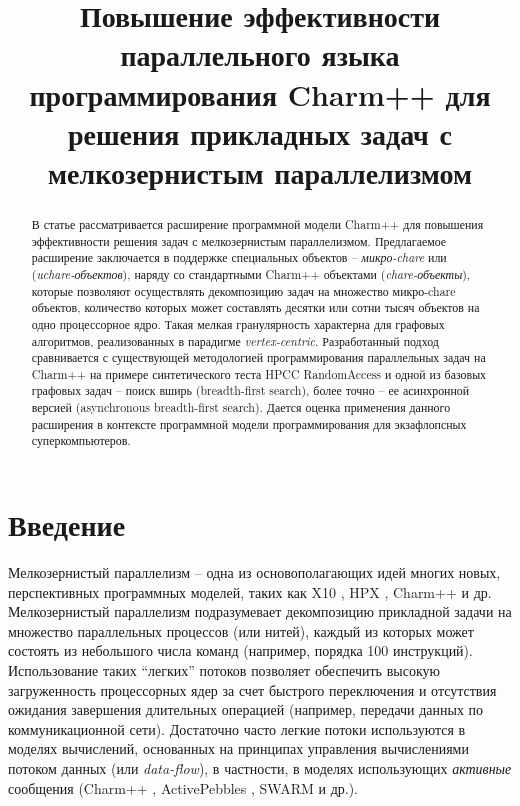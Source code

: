 \documentclass[11pt, oneside, a4paper]{article}
\begin{document}
%
\title{Повышение эффективности параллельного языка программирования Charm++ для решения прикладных задач с мелкозернистым параллелизмом}



\begin{abstract}

В статье рассматривается расширение программной модели Charm++ для повышения эффективности решения задач с 
мелкозернистым параллелизмом. Предлагаемое расширение заключается в поддержке специальных объектов – \textit{микро-chare} 
или (\textit{uchare-объектов}), наряду со стандартными Charm++ объектами (\textit{chare-объекты}), которые позволяют осуществлять 
декомпозицию задач на множество микро-chare объектов, количество которых может составлять десятки или сотни тысяч объектов на 
одно процессорное ядро. Такая мелкая гранулярность характерна для графовых алгоритмов, реализованных в парадигме 
\textit{vertex-centric}. Разработанный подход сравнивается с существующей методологией программирования параллельных задач на Charm++ 
на примере синтетического теста HPCC RandomAccess и одной из базовых графовых задач -- поиск вширь (breadth-first search),
более точно -- ее асинхронной версией (asynchronous breadth-first search). Дается оценка применения данного расширения в контексте 
программной модели программирования для экзафлопсных суперкомпьютеров.

\end{abstract}



\section{Введение}

Мелкозернистый параллелизм -- одна из основополагающих идей многих новых, перспективных программных моделей, таких 
как X10 \cite{Charles2005}, HPX \cite{Kaiser2014}, Charm++ \cite{Kale1993} и др.
Мелкозернистый параллелизм подразумевает декомпозицию прикладной задачи на множество параллельных процессов (или нитей),
каждый из которых может состоять из небольшого числа команд (например, порядка 100 инструкций). Использование таких
``легких'' потоков позволяет обеспечить высокую загруженность процессорных ядер за счет быстрого переключения 
и отсутствия ожидания завершения длительных операцией (например, передачи данных по коммуникационной сети).
Достаточно часто легкие потоки используются в моделях вычислений, основанных на принципах управления вычислениями
потоком данных (или \textit{data-flow}), в частности, в моделях использующих \textit{активные} сообщения (Charm++ \cite{Kale1993}, 
ActivePebbles \cite{Willcock:2011:APP:1995896.1995934, willcock-active-pebbles}, SWARM и др.). 
\end{document}
